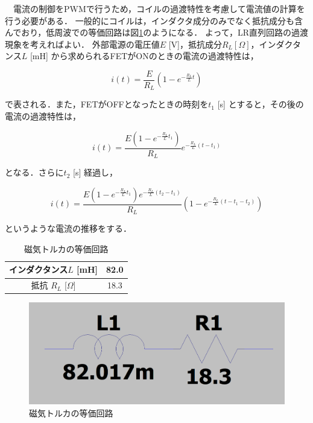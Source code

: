 　電流の制御をPWMで行うため，コイルの過渡特性を考慮して電流値の計算を行う必要がある．
一般的にコイルは，インダクタ成分のみでなく抵抗成分も含んでおり，低周波での等価回路は図\ref{fig:touka}のようになる．
よって，LR直列回路の過渡現象を考えればよい．
外部電源の電圧値$E$ [V]，抵抗成分$R_L [\Omega]$，インダクタンス$L$ [mH] から求められるFETがONのときの電流の過渡特性は，

\begin{equation}
	i(t) = \frac{E}{R_L}\left(1-e^{-\frac{R_L}{L}t}\right)
\end{equation}

で表される．また，FETがOFFとなったときの時刻を$t_1$ [s] とすると，その後の電流の過渡特性は，

\begin{equation}
	i(t) = \frac{E\left(1-e^{-\frac{R_L}{L}t_1}\right)}{R_L}e^{-\frac{R_L}{L}(t-t_1)}
\end{equation}

となる．さらに$t_2$ [s] 経過し，

\begin{equation}
	i(t) = \frac{E\left(1-e^{-\frac{R_L}{L}t_1}\right)e^{-\frac{R_L}{L}(t_2-t_1)}}{R_L}\left(1-e^{-\frac{R_L}{L}(t-t_1-t_2)}\right)
\end{equation}

というような電流の推移をする．

\begin{table}[H]
	\centering
	\caption{磁気トルカの等価回路}
	\label{table:torquer2}
	\begin{tabular}{|c||c|}
		\hline
		インダクタンス$L$ [mH] & 	82.0 \\ \hline %
		抵抗 $R_L$ [$\Omega $] & 18.3 \\ \hline %
	\end{tabular}
\end{table}

\begin{figure}[H]
	\centering
		\includegraphics[scale=0.3]{./figure/touka.png}
		\caption{磁気トルカの等価回路}
		\label{fig:touka}
\end{figure}

